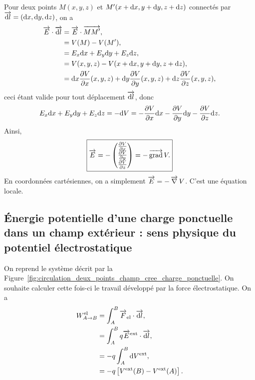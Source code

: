         Pour deux points $M(x,y,z)$ et $M'(x+\mathrm{d} x,y+\mathrm{d} y,z+\mathrm{d} z)$ connectés par $\protect\overrightarrow{{\mathrm{d} l}}=(\mathrm{d} x,\mathrm{d} y, \mathrm{d} z)$, on a
        \begin{align}
            \protect\overrightarrow{{E}}\cdot\protect\overrightarrow{{\mathrm{d} l}}
            &=
            \protect\overrightarrow{{E}}\cdot\protect\overrightarrow{{MM'}},\\
            &=
            V(M)-V(M'),\\
            &=
            E_x\mathrm{d} x+E_y\mathrm{d} y+E_z\mathrm{d} z,\\
            &=
            V(x,y,z)-V(x+\mathrm{d} x,y+\mathrm{d} y,z+\mathrm{d} z),\\
            &=\mathrm{d} x\frac{\partial V}{\partial x}(x,y,z)+\mathrm{d} y\frac{\partial V}{\partial y}(x,y,z)+\mathrm{d} z\frac{\partial V}{\partial z}(x,y,z),
        \end{align}
        ceci étant valide pour tout déplacement $\protect\overrightarrow{{\mathrm{d} l}}$, donc 
        \begin{equation}
            E_x\mathrm{d} x+E_y\mathrm{d} y+E_z\mathrm{d} z=-\mathrm{d} V=-\frac{\partial V}{\partial x}\mathrm{d} x-\frac{\partial V}{\partial y}\mathrm{d} y-\frac{\partial V}{\partial z}\mathrm{d} z.
        \end{equation}
        Ainsi, 
        \begin{equation}
            \boxed{
                \protect\overrightarrow{{E}}=-\begin{pmatrix}
                    \frac{\partial V}{\partial x}\\
                    \frac{\partial V}{\partial y}\\
                    \frac{\partial V}{\partial z}
                \end{pmatrix}
                =-\operatorname{\overrightarrow{\text{grad}}} V.
            }
        \end{equation}
        En coordonnées cartésiennes, on a simplement $\protect\overrightarrow{{E}}=-\operatorname{\overrightarrow{\nabla}} V$. C'est une équation locale.

    \subsection{Énergie potentielle d'une charge ponctuelle dans un champ extérieur : sens physique du potentiel électrostatique}

        On reprend le système décrit par la Figure~\ref{fig:circulation_deux_points_champ_cree_charge_ponctuelle}. On souhaite calculer cette fois-ci le travail développé par la force électrostatique. On a 
        \begin{align}
            W_{A\to B}^{\text{el}}
            &=
            \int_{A}^{B} \protect\overrightarrow{{F}}_{\text{el}}\cdot\protect\overrightarrow{{\mathrm{d} l}},\\
            &=
            \int_{A}^{B}q\protect\overrightarrow{{E}}^{\text{ext}}\cdot\protect\overrightarrow{{\mathrm{d} l}},\\
            &=
            -q\int_{A}^{B}\mathrm{d} V^{\text{ext}},\\
            &=
            -q\left[
                V^{\text{ext}}(B)-V^{\text{ext}}(A)
            \right].
        \end{align}

